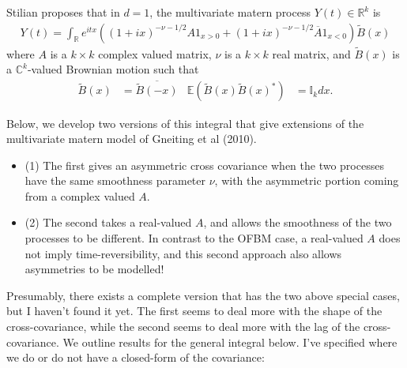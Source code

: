 \documentclass[11pt]{article}
\begin{document}
Stilian proposes that in $d=1$, the multivariate matern process $Y(t) \in \mathbb{R}^k$ is \begin{align*}
 Y(t) = \int_{\mathbb{R}} e^{itx} \left((1 + ix)^{-\nu - 1/2}A 1_{x > 0} + (1 + ix)^{-\nu-1/2} \overline{A}1_{x < 0}\right) \tilde{B}(x)
\end{align*}where $A$ is a $k\times k$ complex valued matrix, $\nu$ is a $k\times k$ real matrix, and $\tilde{B}(x)$ is a $\mathbb{C}^k$-valued Brownian motion such that \begin{align*}
\tilde{B}(x) &= \overline{\tilde{B}(-x)} & \mathbb{E}(\tilde{B}(x) \tilde{B}(x) ^*) &=\mathbb{I}_k dx.
\end{align*}




Below, we develop two versions of this integral that give extensions of the multivariate matern model of Gneiting et al (2010). 
\begin{itemize}
\item (1) The first gives an asymmetric cross covariance when the two processes have the same smoothness parameter $\nu$, with the asymmetric portion coming from a complex valued $A$. 
\item (2) The second takes a real-valued $A$, and allows the smoothness of the two processes to be different. In contrast to the OFBM case, a real-valued $A$ does not imply time-reversibility, and this second approach also allows asymmetries to be modelled!
\end{itemize}
Presumably, there exists a complete version that has the two above special cases, but I haven't found it yet. The first seems to deal more with the shape of the cross-covariance, while the second seems to deal more with the lag of the cross-covariance. 
We outline results for the general integral below. 
I've specified where we do or do not have a closed-form of the covariance:
\end{document}

